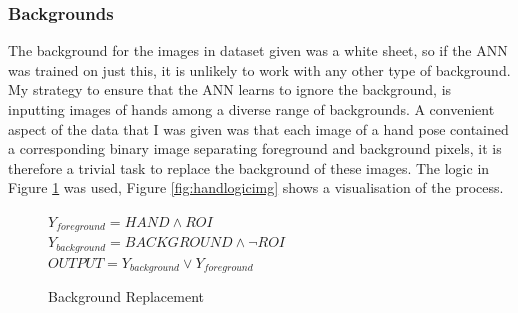         \subsubsection{Backgrounds}
        The background for the images in dataset given was a white sheet, so if the ANN was trained on just this, it is unlikely to work with any other type of background. My strategy to ensure that the ANN learns to ignore the background, is inputting images of hands among a diverse range of backgrounds. A convenient aspect of the data that I was given was that each image of a hand pose contained a corresponding binary image separating foreground and background pixels, it is therefore a trivial task to replace the background of these images. The logic in Figure \ref{fig:handlogic} was used, Figure \ref{fig:handlogicimg} shows a visualisation of the process.
        
        \begin{figure}
            \centering
        $Y_{foreground} = HAND \land ROI$ \\
        $Y_{background} = BACKGROUND \land \lnot ROI$\\
        $OUTPUT = Y_{background} \lor Y_{foreground}$
        \caption{Background Replacement}
        \label{fig:handlogic}
    \end{figure}

